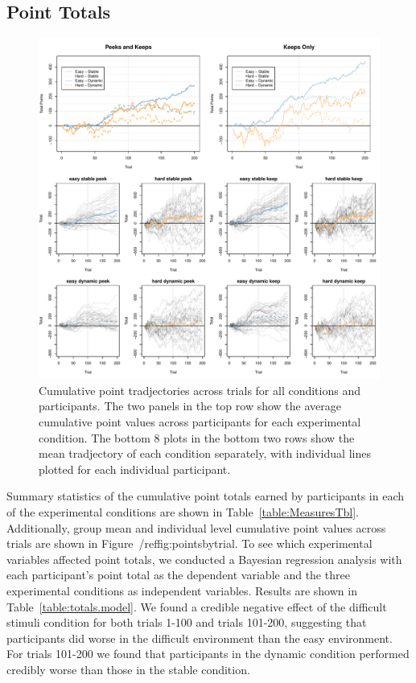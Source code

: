 \documentclass[a4paper,doc,natbib,floatsintext]{apa6}
\begin{document}
\subsection{Point Totals}

\begin{figure}
\centering
\begin{knitrout}
\color{fgcolor}
\includegraphics[width=\maxwidth]{figure/unnamed-chunk-9-1} 

\end{knitrout}
\caption{\label{fig:pointsbytrial}Cumulative point tradjectories across trials for all conditions and participants. The two panels in the top row show the average cumulative point values across participants for each experimental condition. The bottom 8 plots in the bottom two rows show the mean tradjectory of each condition separately, with individual lines plotted for each individual participant.}
\end{figure}


Summary statistics of the cumulative point totals earned by participants in each of the experimental conditions are shown in Table~\ref{table:MeasuresTbl}. Additionally, group mean and individual level cumulative point values across trials are shown in Figure~/ref{fig:pointsbytrial}. To see which experimental variables affected point totals, we conducted a Bayesian regression analysis with each participant's point total as the dependent variable and the three experimental conditions as independent variables. Results are shown in Table~\ref{table:totals.model}. We found a credible negative effect of the difficult stimuli condition for both trials 1-100 and trials 101-200, suggesting that participants did worse in the difficult environment than the easy environment. For trials 101-200 we found that participants in the dynamic condition performed credibly worse than those in the stable condition.

\end{document}
